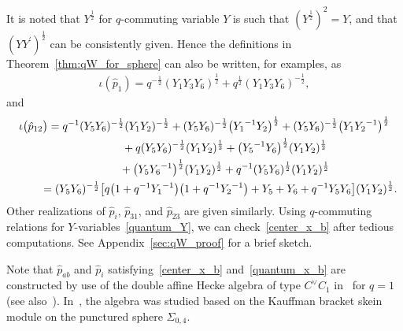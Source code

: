 \documentclass[pdftex]{sigma}
\numberwithin{equation}{section}
\begin{document}
It is noted that $Y^{\frac{1}{2}}$ for $q$-commuting variable $Y$ is such that $(Y^{\frac{1}{2}})^2= Y$, and that $(Y Y^\prime)^{\frac{1}{2}}$ can be consistently given. Hence the definitions in Theorem~\ref{thm:qW_for_sphere} can also be written, for examples, as
\begin{gather} \label{q_p1}
 \iota(\hat{p}_1) = q^{-\frac{1}{2}} ( Y_1 Y_3 Y_6 )^{\frac{1}{2}} + q^{\frac{1}{2}} ( Y_1 Y_3 Y_6 )^{-\frac{1}{2}} ,
\end{gather}
and
\begin{gather}
 \iota\big(\hat{p}_{12}\big) = q^{-1} ( Y_5 Y_6 )^{-\frac{1}{2}} ( Y_1 Y_2 )^{-\frac{1}{2}} + ( Y_5 Y_6 )^{-\frac{1}{2}} \big({Y_1}^{-1} Y_2 \big)^{\frac{1}{2}} + ( Y_5 Y_6)^{-\frac{1}{2}} \big( Y_1{Y_2}^{-1}\big)^{\frac{1}{2}} \nonumber\\
\hphantom{\iota\big(\hat{p}_{12}\big) =}{} + q (Y_5 Y_6)^{-\frac{1}{2}} ( Y_1 Y_2)^{\frac{1}{2}} + \big( {Y_5}^{- 1} Y_6 \big)^{\frac{1}{2}} (Y_1 Y_2)^{\frac{1}{2}}\nonumber \\
\hphantom{\iota\big(\hat{p}_{12}\big) =}{} + \big( Y_5 {Y_6}^{-1} \big)^{\frac{1}{2}} ( Y_1 Y_2)^{\frac{1}{2}} + q^{-1} (Y_5 Y_6)^{\frac{1}{2}} (Y_1 Y_2 )^{\frac{1}{2}}\nonumber \\
\hphantom{\iota\big(\hat{p}_{12}\big)}{} = ( Y_5 Y_6 )^{-\frac{1}{2}} \big[ q \big( 1+q^{-1} {Y_1}^{-1} \big) \big( 1+q^{-1} {Y_2}^{-1} \big) + Y_5 + Y_6 + q^{-1} Y_5 Y_6 \big] ( Y_1 Y_2)^{\frac{1}{2}} . \label{q_p12}
 \end{gather}
Other realizations of $\hat{p}_i$, $\hat{p}_{31}$, and $\hat{p}_{23}$ are given similarly. Using $q$-commuting relations for $Y$-variables~\eqref{quantum_Y}, we can check~\eqref{center_x_b} after tedious computations. See Appendix~\ref{sec:qW_proof} for a brief sketch.

Note that $\hat{p}_{ab}$ and $\hat{p}_i$ satisfying~\eqref{center_x_b} and~\eqref{quantum_x_b} are constructed by use of the double affine Hecke algebra of type $C^\vee C_1$ in~\cite{Oblom04a} for $q=1$ (see also~\cite{Koorn08a,Terwil13a}). In~\cite{BulloPrzyt99a}, the algebra was studied based on the Kauffman bracket skein module on the punctured sphere $\Sigma_{0,4}$.
\end{document}
